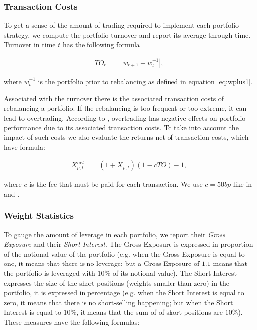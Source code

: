 \documentclass[12pt,oneside,a4paper]{memoir}
\begin{document}
\subsubsection*{Transaction Costs}

To get a sense of the amount of trading required to implement each portfolio strategy, we compute the portfolio turnover and report its average through time.
Turnover in time $t$ has the following formula

\vspace{-18 pt}
\begin{align}
	\label{to}
	TO_{t} &= |w_{t+1} - w_{t}^{+1}|,
\end{align}

\noindent
where $w_{t}^{+1}$ is the portfolio prior to rebalancing as defined in equation \eqref{eq:wplus1}.

Associated with the turnover there is the associated transaction costs of rebalancing a portfolio.
If the rebalancing is too frequent or too extreme, it can lead to overtrading.
According to , overtrading has negative effects on portfolio performance due to its associated transaction costs.
To take into account the impact of such costs we also evaluate the returns net of transaction costs, which have formula:

\vspace{-18 pt}
\begin{align}
	X^{net}_{p,t} &= (1 + X_{p,t} )(1 - c TO) - 1,
\end{align}

\noindent
where $c$ is the fee that must be paid for each transaction.
We use $c=50bp$ like in  and .

\subsubsection*{Weight Statistics}

To gauge the amount of leverage in each portfolio, we report their \textit{Gross Exposure} and their \textit{Short Interest}.
The Gross Exposure is expressed in proportion of the notional value of the portfolio (e.g. when the Gross Exposure is equal to one, it means that there is no leverage; but a Gross Exposure of $1.1$ means that the portfolio is leveraged with $10\%$ of its notional value).
The Short Interest expresses the size of the short positions (weights smaller than zero) in the portfolio, it is expressed in percentage (e.g. when the Short Interest is equal to zero, it means that there is no short-selling happening; but when the Short Interest is equal to $10\%$, it means that the sum of of short positions are $10\%$).
These measures have the following formulas:
\end{document}
